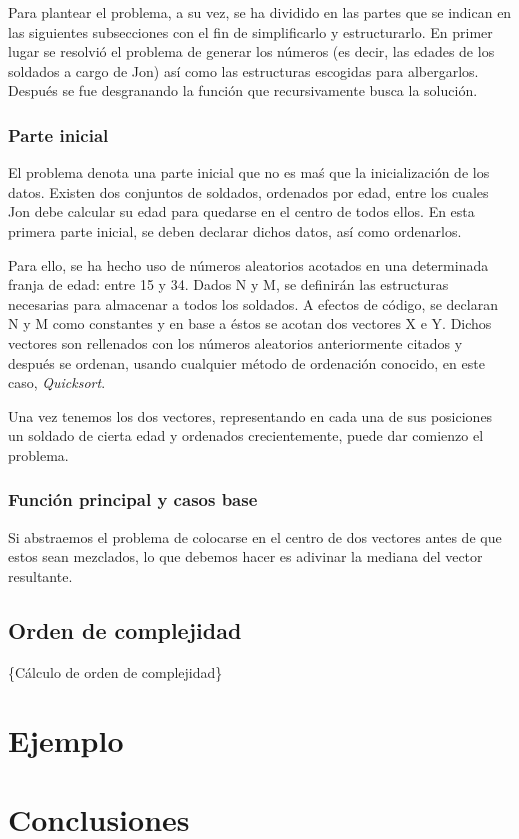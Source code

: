 \documentclass[titlepage,12pt]{article}
\begin{document}
Para plantear el problema, a su vez, se ha dividido en las partes que se indican en las siguientes subsecciones con el fin de simplificarlo y estructurarlo. En primer lugar se resolvió el problema de generar los números (es decir, las edades de los soldados a cargo de Jon) así como las estructuras escogidas para albergarlos. Después se fue desgranando la función que recursivamente busca la solución. 

\subsubsection{Parte inicial}

El problema denota una parte inicial que no es maś que la inicialización de los datos. Existen dos conjuntos de soldados, ordenados por edad, entre los cuales Jon debe calcular su edad para quedarse en el centro de todos ellos. En esta primera parte inicial, se deben declarar dichos datos, así como ordenarlos. 

Para ello, se ha hecho uso de números aleatorios acotados en una determinada franja de edad: entre 15 y 34. Dados N y M, se definirán las estructuras necesarias para almacenar a todos los soldados. A efectos de código, se declaran N y M como constantes y en base a éstos se acotan dos vectores X e Y. Dichos vectores son rellenados con los números aleatorios anteriormente citados y después se ordenan, usando cualquier método de ordenación conocido, en este caso, \textit{Quicksort}. 

Una vez tenemos los dos vectores, representando en cada una de sus posiciones un soldado de cierta edad y ordenados crecientemente, puede dar comienzo el problema. 

\subsubsection{Función principal y casos base}

Si abstraemos el problema de colocarse en el centro de dos vectores antes de que estos sean mezclados, lo que debemos hacer es adivinar la mediana del vector resultante. 

\subsection{Orden de complejidad}

 \{Cálculo de orden de complejidad\}

\section{Ejemplo}

\section{Conclusiones}
\end{document}

